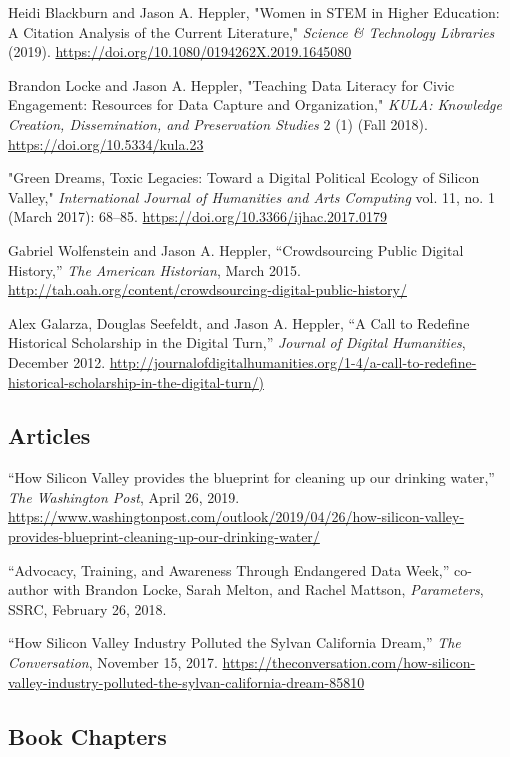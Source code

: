 \documentclass[10pt]{article}
\begin{document}
Heidi Blackburn and Jason A. Heppler, "Women in STEM in Higher Education: A Citation Analysis of the Current Literature," \textit{Science \& Technology Libraries} (2019). \url{https://doi.org/10.1080/0194262X.2019.1645080}

Brandon Locke and Jason A. Heppler, "Teaching Data Literacy for Civic Engagement: Resources for Data Capture and Organization," \textit{KULA: Knowledge Creation, Dissemination, and Preservation Studies} 2 (1) (Fall 2018). \url{https://doi.org/10.5334/kula.23}

"Green Dreams, Toxic Legacies: Toward a Digital Political Ecology of Silicon Valley," \textit{International Journal of Humanities and Arts Computing} vol. 11, no. 1 (March 2017): 68--85. \url{https://doi.org/10.3366/ijhac.2017.0179}

Gabriel Wolfenstein and Jason A. Heppler, ``Crowdsourcing Public Digital History,'' \textit{The American Historian}, March 2015. \url{http://tah.oah.org/content/crowdsourcing-digital-public-history/}

Alex Galarza, Douglas Seefeldt, and Jason A. Heppler, ``A Call to Redefine Historical Scholarship in the Digital Turn,'' \textit{Journal of Digital Humanities}, December 2012. \url{http://journalofdigitalhumanities.org/1-4/a-call-to-redefine-historical-scholarship-in-the-digital-turn/)}

\subsection{Articles}\label{articles}

``How Silicon Valley provides the blueprint for cleaning up our drinking water,'' \textit{The Washington Post}, April 26, 2019. \url{https://www.washingtonpost.com/outlook/2019/04/26/how-silicon-valley-provides-blueprint-cleaning-up-our-drinking-water/}

``Advocacy, Training, and Awareness Through Endangered Data Week,'' co-author with Brandon Locke, Sarah Melton, and Rachel Mattson, \textit{Parameters}, SSRC, February 26, 2018.

``How Silicon Valley Industry Polluted the Sylvan California Dream,'' \textit{The Conversation}, November 15, 2017. \url{https://theconversation.com/how-silicon-valley-industry-polluted-the-sylvan-california-dream-85810}

\subsection{Book Chapters}
\end{document}
